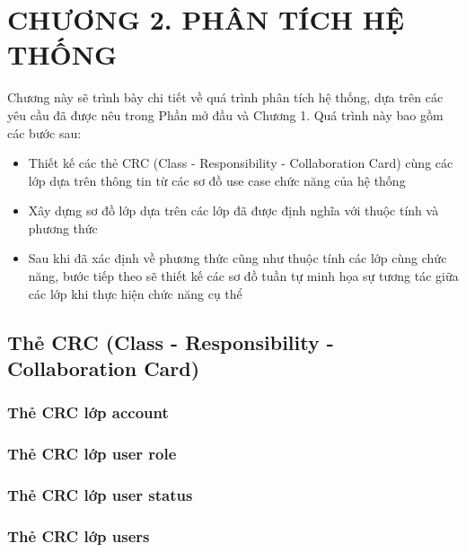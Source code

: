 
\section*{CHƯƠNG 2. PHÂN TÍCH HỆ THỐNG}
\setcounter{section}{2}
\setcounter{subsection}{0} %
\setcounter{table}{0} %
\setcounter{figure}{0} %
Chương này sẽ trình bày chi tiết về quá trình phân tích hệ thống, dựa trên các yêu cầu đã được nêu trong Phần mở đầu và Chương 1. Quá trình này bao gồm các bước sau:\begin{adjustwidth}{1.5em}{}
  \begin{itemize}
    \item Thiết kế các thẻ CRC (Class - Responsibility - Collaboration Card) cùng các lớp dựa trên thông tin từ các sơ đồ use case chức năng của hệ thống
    \item Xây dựng sơ đồ lớp dựa trên các lớp đã được định nghĩa với thuộc tính và phương thức
    \item Sau khi đã xác định về phương thức cũng như thuộc tính các lớp cùng chức năng, bước tiếp theo sẽ thiết kế các sơ đồ tuần tự minh họa sự tương tác giữa các lớp 
          khi thực hiện chức năng cụ thể
  \end{itemize}
  \end{adjustwidth}
\subsection{Thẻ CRC (Class - Responsibility - Collaboration Card)}

\subsubsection{Thẻ CRC lớp account}
\subsubsection{Thẻ CRC lớp user role}

\subsubsection{Thẻ CRC lớp user status}

\subsubsection{Thẻ CRC lớp users}

